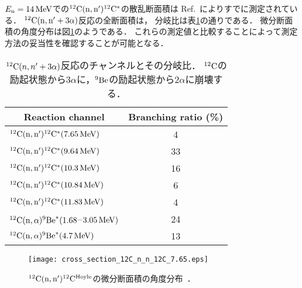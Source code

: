 \documentclass[../master]{subfiles}
\begin{document}
$E_{\rm n}=\SIU{14}{\mega\electronvolt}$での${}^{12}{\rm C}({\rm n},{\rm n}'){}^{12}{\rm C}^{*}$の散乱断面積は
Ref.~\cite{takahashietal,kondoetal}によりすでに測定されている．
${}^{12}{\rm C}({\rm n},{\rm n}'+3\alpha)$反応の全断面積は，
分岐比は表\ref{tab::branchingratio}の通りである．
微分断面積の角度分布は図\ref{fig::sig_angle_dist}のようである．
これらの測定値と比較することによって測定方法の妥当性を確認することが可能となる．

\begin{table}
  \centering
  \caption[${}^{12}{\rm C}(n,n'+3\alpha)$反応のチャンネルとその分岐比．]
          {${}^{12}{\rm C}(n,n'+3\alpha)$反応のチャンネルとその分岐比．
  ${}^{12}{\rm C}$の励起状態から$3\alpha$に，${}^{9}{\rm Be}$の励起状態から$2\alpha$に崩壊する．}
  \label{tab::branchingratio}
  \begin{tabular}{lc}
    \toprule
    \multicolumn{1}{c}{Reaction channel} & Branching ratio (\%)\\
    \midrule
    ${}^{12}{\rm C}({\rm n},{\rm n}'){}^{12}{\rm C}^{*}(\SIU{7.65}{\mega\electronvolt})$ & 4\\
    ${}^{12}{\rm C}({\rm n},{\rm n}'){}^{12}{\rm C}^{*}(\SIU{9.64}{\mega\electronvolt})$ & 33\\
    ${}^{12}{\rm C}({\rm n},{\rm n}'){}^{12}{\rm C}^{*}(\SIU{10.3}{\mega\electronvolt})$ & 16\\
    ${}^{12}{\rm C}({\rm n},{\rm n}'){}^{12}{\rm C}^{*}(\SIU{10.84}{\mega\electronvolt})$ & 6\\
    ${}^{12}{\rm C}({\rm n},{\rm n}'){}^{12}{\rm C}^{*}(\SIU{11.83}{\mega\electronvolt})$ & 4\\
    ${}^{12}{\rm C}({\rm n},\alpha){}^{9}{\rm Be}^{*}(\SIU{1.68}{}$--$\SIU{3.05}{\mega\electronvolt})$ & 24\\
    ${}^{12}{\rm C}({\rm n},\alpha){}^{9}{\rm Be}^{*}(\SIU{4.7}{\mega\electronvolt})$ & 13\\
    \bottomrule
  \end{tabular}
\end{table}

\begin{figure}
  \centering
  \texttt{[image: cross\_section\_12C\_n\_n\_12C\_7.65.eps]}
  \caption[${}^{12}{\rm C}({\rm n},{\rm n}'){}^{12}{\rm C}^{\rm Hoyle}$の微分断面積の角度分布．]
          {${}^{12}{\rm C}({\rm n},{\rm n}'){}^{12}{\rm C}^{\rm Hoyle}$の微分断面積の角度分布~\cite{kondoetal}．}
  \label{fig::sig_angle_dist}
\end{figure}
\end{document}
